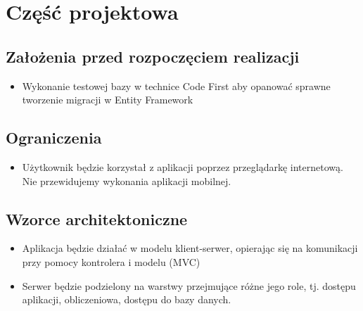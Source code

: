 \documentclass{article}
\begin{document}
\pagebreak
\section{Część projektowa}
\subsection{Założenia przed rozpoczęciem realizacji}
\begin{itemize}
    \item Wykonanie testowej bazy w technice Code First aby opanować sprawne tworzenie migracji w Entity Framework
\end{itemize}

\subsection{Ograniczenia}
\begin{itemize}
    \item Użytkownik będzie korzystał z aplikacji poprzez przeglądarkę internetową. Nie przewidujemy wykonania aplikacji mobilnej.
\end{itemize}

\subsection{Wzorce architektoniczne}
\begin{itemize}
    \item Aplikacja będzie działać w modelu klient-serwer, opierając się na komunikacji przy pomocy kontrolera i modelu (MVC)
    \item Serwer będzie podzielony na warstwy przejmujące różne jego role, tj. dostępu aplikacji, obliczeniowa, 
    dostępu do bazy danych.
\end{itemize}

\pagebreak
\end{document}
